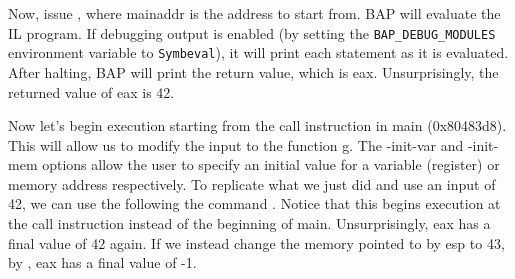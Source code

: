 Now, issue , where
mainaddr is the address to start from.  BAP will evaluate the IL
program.  If debugging output is enabled (by setting the
\texttt{BAP\_DEBUG\_MODULES} environment variable to
\texttt{Symbeval}), it will print each statement as it is evaluated.
After halting, BAP will print the return value, which is
eax. Unsurprisingly, the returned value of eax is 42.

Now let's begin execution starting from the call instruction in main
(0x80483d8). This will allow us to modify the input to the function
g. The -init-var and -init-mem options allow the user to specify an
initial value for a variable (register) or memory address
respectively.  To replicate what we just did and use an input of 42,
we can use the following the command . Notice that this
begins execution at the call instruction instead of the beginning of
main.  Unsurprisingly, eax has a final value of 42 again.  If we
instead change the memory pointed to by esp to 43, by , eax has
a final value of -1.

